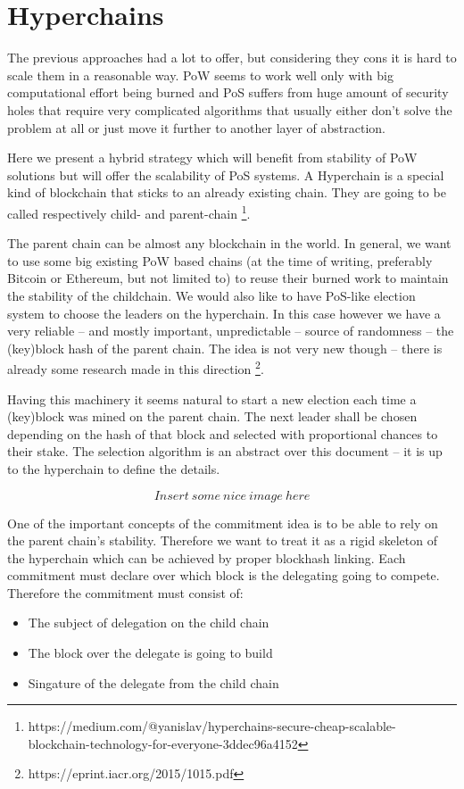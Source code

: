 \section{Hyperchains}

The previous approaches had a lot to offer, but considering they cons it is hard
to scale them in a reasonable way. PoW seems to work well only with big
computational effort being burned and PoS suffers from huge amount of security
holes that require very complicated algorithms that usually either don't solve
the problem at all or just move it further to another layer of abstraction.

Here we present a hybrid strategy which will benefit from stability of PoW
solutions but will offer the scalability of PoS systems. A Hyperchain is a
special kind of blockchain that sticks to an already existing chain. They are
going to be called respectively child- and parent-chain
\footnote{https://medium.com/@yanislav/hyperchains-secure-cheap-scalable-blockchain-technology-for-everyone-3ddec96a4152}.

The parent chain can be almost any blockchain in the world. In general, we want
to use some big existing PoW based chains (at the time of writing, preferably
Bitcoin or Ethereum, but not limited to) to reuse their burned work to maintain
the stability of the childchain. We would also like to have
PoS-like election system to choose the leaders on the hyperchain. In this case
however we have a very reliable – and mostly important, unpredictable – source
of randomness – the (key)block hash of the parent chain. The idea is not very new
though – there is already some research made in this direction
\footnote{https://eprint.iacr.org/2015/1015.pdf}.

Having this machinery it seems natural to start a new election each time a
(key)block was mined on the parent chain. The next leader shall be chosen
depending on the hash of that block and selected with proportional chances to
their stake. The selection algorithm is an abstract over this document – it is
up to the hyperchain to define the details.

$$Insert\ some\ nice\ image\ here$$

One of the important concepts of the commitment idea is to be able to rely on
the parent chain's stability. Therefore we want to treat it as a rigid skeleton
of the hyperchain which can be achieved by proper blockhash linking. Each
commitment must declare over which block is the delegating going to compete.
Therefore the commitment must consist of:
\begin{itemize}
\item The subject of delegation on the child chain
\item The block over the delegate is going to build
\item Singature of the delegate from the child chain
\end{itemize}

